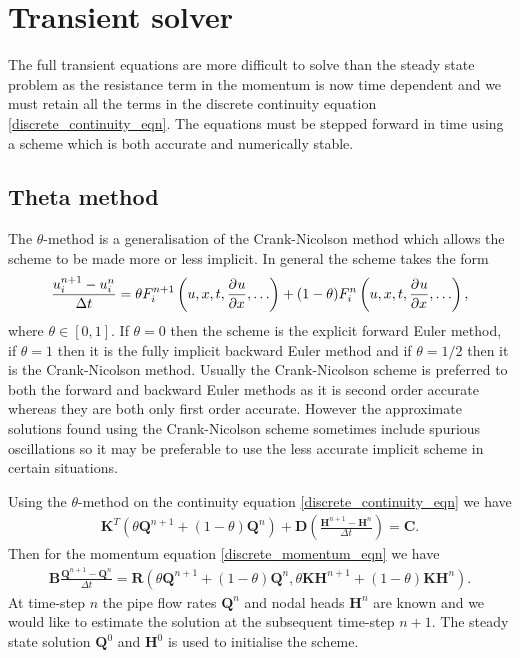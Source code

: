 \section{Transient solver} \label{sec:transient_solver}

The full transient equations are more difficult to solve than the steady state problem as the resistance term in the momentum is now time dependent and we must retain all the terms in the discrete continuity equation \eqref{discrete_continuity_eqn}. The equations must be stepped forward in time using a scheme which is both accurate and numerically stable. 

\subsection{Theta method}

The $\theta$-method is a generalisation of the Crank-Nicolson method which allows the scheme to be made more or less implicit. In general the scheme takes the form
\begin{align}
\frac{u_i^{n+1} - u_i^{n}}{\Delta t} = \theta F_i^{n+1}\left(u,x,t,\frac{\partial^{} u}{\partial x^{}},\ldots \right) + (1-\theta) F_i^{n}\left(u,x,t,\frac{\partial^{} u}{\partial x^{}},\ldots \right),
\end{align}
where $\theta \in [0,1]$. If $\theta = 0$ then the scheme is the explicit forward Euler method, if $\theta = 1$ then it is the fully implicit backward Euler method and if $\theta = 1/2$ then it is the Crank-Nicolson method. Usually the Crank-Nicolson scheme is preferred to both the forward and backward Euler methods as it is second order accurate whereas they are both only first order accurate. However the approximate solutions found using the Crank-Nicolson scheme sometimes include spurious oscillations so it may be preferable to use the less accurate implicit scheme in certain situations.


Using the $\theta$-method on the continuity equation \eqref{discrete_continuity_eqn} we have
\begin{align}
\mathbf{K}^T \left( \theta \mathbf{Q}^{n+1} + (1-\theta)\mathbf{Q}^{n} \right) + \mathbf{D} \left( \frac{\mathbf{H}^{n+1} - \mathbf{H}^{n}}{\Delta t} \right) = \mathbf{C}.
\end{align}
Then for the momentum equation \eqref{discrete_momentum_eqn} we have
\begin{align}
\mathbf{B} \frac{\mathbf{Q}^{n+1} - \mathbf{Q}^{n}}{\Delta t} = \mathbf{R}\left( \theta \mathbf{Q}^{n+1} + (1-\theta)\mathbf{Q}^{n}, \theta \mathbf{K} \mathbf{H}^{n+1} + (1-\theta) \mathbf{K} \mathbf{H}^n \right).
\end{align}
At time-step $n$ the pipe flow rates $\mathbf{Q}^{n}$ and nodal heads $\mathbf{H}^{n}$ are known and we would like to estimate the solution at the subsequent time-step $n+1$. The steady state solution $\mathbf{Q}^{0}$ and $\mathbf{H}^{0}$ is used to initialise the scheme.

